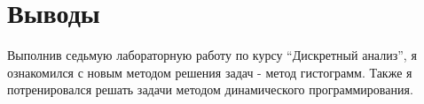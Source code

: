\section{Выводы}
Выполнив седьмую лабораторную работу по курсу \enquote{Дискретный анализ}, я ознакомился с новым методом решения задач - метод гистограмм. Также я потренировался решать задачи методом динамического программирования.
\pagebreak
